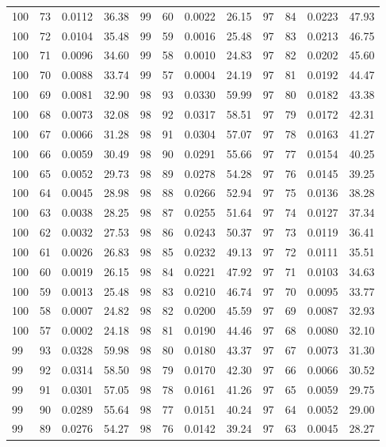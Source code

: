 \begin{tabular}{llll|llll|llll}
100 & 73 & 0.0112 & 36.38 & 99 & 60 & 0.0022 & 26.15 & 97 & 84 & 0.0223 & 47.93\\
100 & 72 & 0.0104 & 35.48 & 99 & 59 & 0.0016 & 25.48 & 97 & 83 & 0.0213 & 46.75\\
100 & 71 & 0.0096 & 34.60 & 99 & 58 & 0.0010 & 24.83 & 97 & 82 & 0.0202 & 45.60\\
100 & 70 & 0.0088 & 33.74 & 99 & 57 & 0.0004 & 24.19 & 97 & 81 & 0.0192 & 44.47\\
100 & 69 & 0.0081 & 32.90 & 98 & 93 & 0.0330 & 59.99 & 97 & 80 & 0.0182 & 43.38\\
100 & 68 & 0.0073 & 32.08 & 98 & 92 & 0.0317 & 58.51 & 97 & 79 & 0.0172 & 42.31\\
100 & 67 & 0.0066 & 31.28 & 98 & 91 & 0.0304 & 57.07 & 97 & 78 & 0.0163 & 41.27\\
100 & 66 & 0.0059 & 30.49 & 98 & 90 & 0.0291 & 55.66 & 97 & 77 & 0.0154 & 40.25\\
100 & 65 & 0.0052 & 29.73 & 98 & 89 & 0.0278 & 54.28 & 97 & 76 & 0.0145 & 39.25\\
100 & 64 & 0.0045 & 28.98 & 98 & 88 & 0.0266 & 52.94 & 97 & 75 & 0.0136 & 38.28\\
100 & 63 & 0.0038 & 28.25 & 98 & 87 & 0.0255 & 51.64 & 97 & 74 & 0.0127 & 37.34\\
100 & 62 & 0.0032 & 27.53 & 98 & 86 & 0.0243 & 50.37 & 97 & 73 & 0.0119 & 36.41\\
100 & 61 & 0.0026 & 26.83 & 98 & 85 & 0.0232 & 49.13 & 97 & 72 & 0.0111 & 35.51\\
100 & 60 & 0.0019 & 26.15 & 98 & 84 & 0.0221 & 47.92 & 97 & 71 & 0.0103 & 34.63\\
100 & 59 & 0.0013 & 25.48 & 98 & 83 & 0.0210 & 46.74 & 97 & 70 & 0.0095 & 33.77\\
100 & 58 & 0.0007 & 24.82 & 98 & 82 & 0.0200 & 45.59 & 97 & 69 & 0.0087 & 32.93\\
100 & 57 & 0.0002 & 24.18 & 98 & 81 & 0.0190 & 44.46 & 97 & 68 & 0.0080 & 32.10\\
99 & 93 & 0.0328 & 59.98 & 98 & 80 & 0.0180 & 43.37 & 97 & 67 & 0.0073 & 31.30\\
99 & 92 & 0.0314 & 58.50 & 98 & 79 & 0.0170 & 42.30 & 97 & 66 & 0.0066 & 30.52\\
99 & 91 & 0.0301 & 57.05 & 98 & 78 & 0.0161 & 41.26 & 97 & 65 & 0.0059 & 29.75\\
99 & 90 & 0.0289 & 55.64 & 98 & 77 & 0.0151 & 40.24 & 97 & 64 & 0.0052 & 29.00\\
99 & 89 & 0.0276 & 54.27 & 98 & 76 & 0.0142 & 39.24 & 97 & 63 & 0.0045 & 28.27\\

\end{tabular}
